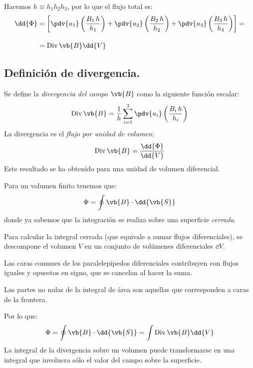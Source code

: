 Hacemos $h \equiv h_{1} h_{2} h_{3}$, por lo que el flujo total es:
\fontsize{12}{12}\selectfont
\begin{align*}
\dd{\Phi} &= \left[ \pdv{u_{1}} \left( \dfrac{B_{1} \, h}{h_{1}} \right) + \pdv{u_{2}} \left( \dfrac{B_{2} \, h}{h_{2}} \right) + \pdv{u_{3}} \left( \dfrac{B_{3} \, h}{h_{3}} \right) \right] = \\[1em]
&= {\rm Div} \, \vb{B} \dd{V}
\end{align*}
\subsection{Definición de divergencia.}
Se define la \emph{divergencia del campo $\vb{B}$} como la siguiente función escalar:
\begin{align}
{\rm Div} \, \vb{B} = \dfrac{1}{h} \sum_{i=1}^{3} \pdv{u_{i}} \left( \dfrac{B_{i} \, h}{h_{i}} \right)
\label{eq:ecuacion_01_30}
\end{align}
La divergencia es el \emph{flujo por unidad de volumen}:
\begin{align*}
{\rm Div} \, \vb{B} = \dfrac{\dd{\Phi}}{\dd{V}}
\end{align*}
Este resultado se ha obtenido para una unidad de volumen diferencial.
\par
Para un volumen finito tenemos que:
\begin{align*}
\Phi = \oint \vb{B} \cdot \dd{\vb{S}}
\end{align*}
donde ya sabemos que la integración se realiza sobre una superficie \emph{cerrada}.
\par
Para calcular la integral cerrada (que equivale a sumar flujos diferenciales), se descompone el volumen $V$ en un conjunto de volúmenes diferenciales $\dd{V}$.
\par
Las caras comunes de los paralelepípedos diferenciales contribuyen con flujos iguales y opuestos en signo, que se cancelan al hacer la suma.
\par
Las partes no nulas de la integral de área son aquellas que corresponden a caras de la frontera.
\par
Por lo que:
\begin{align*}
\Phi = \oint \vb{B} \cdot \dd{\vb{S}} = \int {\rm Div} \, \vb{B} \dd{V}
\end{align*}
La integral de la divergencia sobre un volumen puede transformarse en una integral que involucra sólo el valor del campo sobre la superficie.
